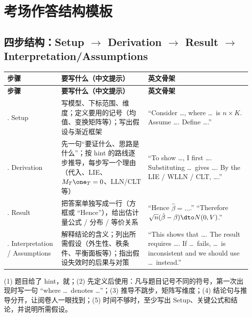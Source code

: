 \section{考场作答结构模板}\label{sec:UappC-structure}

\subsection{四步结构：Setup \texorpdfstring{$\to$}{->} Derivation \texorpdfstring{$\to$}{->} Result \texorpdfstring{$\to$}{->} Interpretation/Assumptions}

{\renewcommand{\arraystretch}{1.15}\begin{longtable}{@{}>{\raggedright\arraybackslash}p{2.6cm}>{\raggedright\arraybackslash}p{6.2cm}>{\raggedright\arraybackslash}p{6.9cm}@{}}
\toprule
\textbf{步骤} & \textbf{要写什么（中文提示）} & \textbf{英文骨架}\\
\midrule
\endfirsthead
\toprule
\textbf{步骤} & \textbf{要写什么（中文提示）} & \textbf{英文骨架}\\
\midrule
\endhead
\bottomrule
\endlastfoot
1. Setup & 写模型、下标范围、维度；定义要用的记号（均值、变换矩阵等）；写出假设与渐近框架 & “Consider \ldots, where \ldots\ is $n\times K$. Assume \ldots. Define \ldots.”\\
\addlinespace[2pt]
2. Derivation & 先一句“要证什么、思路是什么”；按 hint 的路线逐步推导，每步写一个理由（代入、LIE、$M_T\one_T=0$、LLN/CLT 等） & “To show \ldots, I first \ldots. Substituting \ldots\ gives \ldots. By the LIE / WLLN / CLT, \ldots.”\\
\addlinespace[2pt]
3. Result & 把答案单独写成一行（方框或 “Hence”），给出估计量公式 / 分布 / 等价关系 & “Hence $\hat\beta=\ldots$.” “Therefore $\sqrt n(\hat\beta-\beta)\dto N(0,V)$.”\\
\addlinespace[2pt]
4. Interpretation / Assumptions & 解释结论的含义；列出所需假设（外生性、秩条件、平衡面板等）；指出假设失效时的后果与对策 & “This shows that \ldots. The result requires \ldots. If \ldots\ fails, \ldots\ is inconsistent and we should use \ldots\ instead.”\\
\end{longtable}}


\begin{note}[作答要点]
(1) 题目给了 hint，就；(2) 先定义后使用：凡与题目记号不同的符号，第一次出现时写一句 “where \ldots\ denotes \ldots”；(3) 推导不跳步，矩阵写维度；(4) 结论句与推导分开，让阅卷人一眼找到；(5) 时间不够时，至少写出 Setup、关键公式和结论，并说明所需假设。
\end{note}

